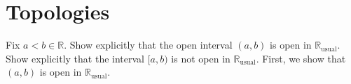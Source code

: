 \chapter{Topologies}

\begin{ExerciseList}
	\Exercise{}
		Fix $a<b\in\mathbb{R}$. Show explicitly that the open interval $(a,b)$ is open in $\mathbb{R}_{\text{usual}}$. Show explicitly
		that the interval $[a,b)$ is not open in $\mathbb{R}_{\text{usual}}$.
	\Answer First, we show that $(a, b)$ is open in $\mathbb{R}_{\text{usual}}$.
\end{ExerciseList}